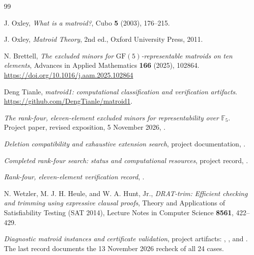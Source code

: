 \documentclass[11pt,letterpaper,titlepage]{article}
\begin{document}
\clearpage
\begin{thebibliography}{99}

J. Oxley,
\textit{What is a matroid?},
Cubo \textbf{5} (2003), 176--215.

J. Oxley,
\textit{Matroid Theory},
2nd ed., Oxford University Press, 2011.

N. Brettell,
\textit{The excluded minors for $\mathrm{GF}(5)$-representable matroids on ten elements},
Advances in Applied Mathematics \textbf{166} (2025), 102864.
\url{https://doi.org/10.1016/j.aam.2025.102864}

Deng Tianle,
\textit{matroid1: computational classification and verification artifacts}.
\url{https://github.com/DengTianle/matroid1}.

\textit{The rank-four, eleven-element excluded minors for representability over \(\mathbb{F}_5\)}.
Project paper, revised exposition, 5 November 2026, .

\textit{Deletion compatibility and exhaustive extension search},
project documentation, .

\textit{Completed rank-four search: status and computational resources},
project record, .

\textit{Rank-four, eleven-element verification record},
.

N. Wetzler, M. J. H. Heule, and W. A. Hunt, Jr.,
\textit{DRAT-trim: Efficient checking and trimming using expressive clausal proofs},
Theory and Applications of Satisfiability Testing (SAT 2014),
Lecture Notes in Computer Science \textbf{8561}, 422--429.

\textit{Diagnostic matroid instances and certificate validation},
project artifacts: ,
, and
.
The last record documents the 13 November 2026 recheck of all 24 cases.


\end{thebibliography}
\end{document}
